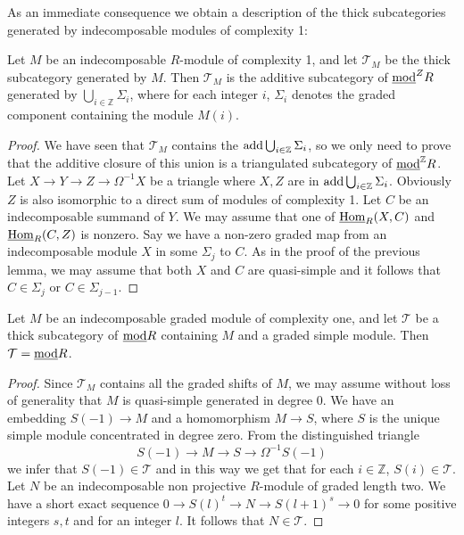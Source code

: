 \documentclass[10pt]{amsart}
\begin{document}
\noindent As an immediate consequence we obtain a description of the thick subcategories 
generated by indecomposable modules of complexity 1:

\begin{prop} Let $M$ be an indecomposable $R$-module of complexity 1, and let 
$\mathcal T_M$ be the thick subcategory generated by $M$. Then $\mathcal T_M$ is 
the additive subcategory of $\underline{\operatorname{mod}}^ZR$ generated by $\bigcup_{i\in\mathbb Z}\Sigma_i$, 
where for each integer $i$, $\Sigma_i$ denotes the graded \AR component containing the module $M(i)$.
\end{prop}
\begin{proof} { We have seen that $\mathcal T_M$ contains the $\operatorname{add}\bigcup_{i\in\mathbb Z}\Sigma_i$, 
so we only need to prove that the additive closure of this union is a triangulated 
subcategory of $\underline{\operatorname{mod}}^{\mathbb Z}R$. Let $X\rightarrow Y\rightarrow Z\rightarrow\Omega^{-1}X$ 
be a triangle where $X,Z$ are in $\operatorname{add}\bigcup_{i\in\mathbb Z}\Sigma_i$. Obviously $Z$ is also isomorphic 
to a direct sum of modules of complexity 1. Let $C$ be an 
indecomposable summand of $Y$. We may assume that one of $\underline{\operatorname{Hom}}_R(X,C)$ and 
$\underline{\operatorname{Hom}}_R(C,Z)$ is nonzero.  Say we have a non-zero graded map from an indecomposable module $X$ in
some $\Sigma_j$ to  $C$. As in the proof of the previous lemma, we may assume that both $X$ and $C$ are quasi-simple and it 
follows that $C\in\Sigma_j$ or $C\in\Sigma_{j-1}$.}
\end{proof}

\begin{lemma} Let $M$ be an indecomposable graded module of complexity one, 
and let $\mathcal T$ be a thick subcategory of $\underline{\operatorname{mod}} R$ 
containing $M$ and a graded simple module. Then $\mathcal T=\underline{\operatorname{mod}} R$.
\end{lemma}
\begin{proof} Since $\mathcal T_M$ contains all the graded shifts of $M$, 
we may assume without loss of generality that $M$ is quasi-simple generated 
in degree 0. We have an embedding $S(-1)\rightarrow M$
 and a homomorphism $M\rightarrow S$, where $S$ is the unique simple module 
concentrated in degree zero. From the distinguished triangle $$S(-1)\rightarrow
M\rightarrow S\rightarrow\Omega^{-1}S(-1)$$ 
\noindent we infer that $S(-1)\in\mathcal T$ and 
in this way we get that for each $i\in\mathbb Z$, $S(i)\in\mathcal T$. Let $N$ 
be an indecomposable non projective $R$-module of graded length two.
 We have a short exact sequence $0\rightarrow S(l)^t\rightarrow N\rightarrow S(l+1)^s\rightarrow 0$ 
for some positive integers $s,t$ and for an integer $l$. It follows that $N\in\mathcal T$.
\end{proof}
\end{document}
